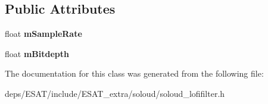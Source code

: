 \subsection*{Public Attributes}
\begin{DoxyCompactItemize}
\item 
\mbox{\label{class_so_loud_1_1_lofi_filter_afe20e30a72a4dc5b932a6a53fb09c3d0}} 
float {\bfseries m\+Sample\+Rate}
\item 
\mbox{\label{class_so_loud_1_1_lofi_filter_a6a2fe000f5f8e87031002de789f8fecc}} 
float {\bfseries m\+Bitdepth}
\end{DoxyCompactItemize}


The documentation for this class was generated from the following file\+:\begin{DoxyCompactItemize}
\item 
deps/\+E\+S\+A\+T/include/\+E\+S\+A\+T\+\_\+extra/soloud/soloud\+\_\+lofifilter.\+h\end{DoxyCompactItemize}
